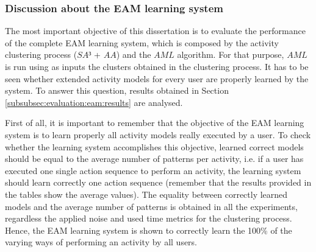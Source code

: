 \subsubsection{Discussion about the EAM learning system}
\label{subsubsec:evaluation:eam:discussion}

The most important objective of this dissertation is to evaluate the performance of the complete EAM learning system, which is composed by the activity clustering process ($SA³$ + $AA$) and the $AML$ algorithm. For that purpose, $AML$ is run using as inputs the clusters obtained in the clustering process. It has to be seen whether extended activity models for every user are properly learned by the system. To answer this question, results obtained in Section \ref{subsubsec:evaluation:eam:results} are analysed.


First of all, it is important to remember that the objective of the EAM learning system is to learn properly all activity models really executed by a user. To check whether the learning system accomplishes this objective, learned correct models should be equal to the average number of patterns per activity, i.e. if a user has executed one single action sequence to perform an activity, the learning system should learn correctly one action sequence (remember that the results provided in the tables show the average values). The equality between correctly learned models and the average number of patterns is obtained in all the experiments, regardless the applied noise and used time metrics for the clustering process. Hence, the EAM learning system is shown to correctly learn the 100\% of the varying ways of performing an activity by all users.


